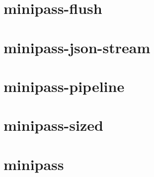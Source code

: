 \documentclass[twoside]{book}
\newcommand{\+}{\discretionary{\mbox{\scriptsize$\hookleftarrow$}}{}{}}
\begin{document}
\chapter{minipass-\/flush}
\label{md__c___users_vaishnavi_jadhav__desktop__developer_code_mean_stack_example_client_node_modules_minipass_flush__r_e_a_d_m_e}

\chapter{minipass-\/json-\/stream}
\label{md__c___users_vaishnavi_jadhav__desktop__developer_code_mean_stack_example_client_node_modules_m4db6b0ad7e44d2736a5f7407508d0c33}

\chapter{minipass-\/pipeline}
\label{md__c___users_vaishnavi_jadhav__desktop__developer_code_mean_stack_example_client_node_modules_minipass_pipeline__r_e_a_d_m_e}

\chapter{minipass-\/sized}
\label{md__c___users_vaishnavi_jadhav__desktop__developer_code_mean_stack_example_client_node_modules_minipass_sized__r_e_a_d_m_e}

\chapter{minipass}
\label{md__c___users_vaishnavi_jadhav__desktop__developer_code_mean_stack_example_client_node_modules_minipass__r_e_a_d_m_e}

\end{document}
